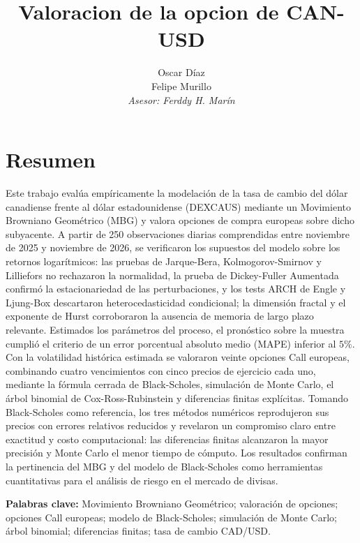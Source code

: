 \documentclass{article}
\title{Valoracion de la opcion de CAN-USD}
\author{
    Oscar Díaz\\
    Felipe Murillo\\
    \textit{Asesor: Ferddy H. Marín}
}
\date{}
\begin{document}
\maketitle

\section*{Resumen}
Este trabajo evalúa empíricamente la modelación de la tasa de cambio del dólar canadiense frente al dólar estadounidense (DEXCAUS) mediante un Movimiento Browniano Geométrico (MBG) y valora opciones de compra europeas sobre dicho subyacente. A partir de 250 observaciones diarias comprendidas entre noviembre de 2025 y noviembre de 2026, se verificaron los supuestos del modelo sobre los retornos logarítmicos: las pruebas de Jarque-Bera, Kolmogorov-Smirnov y Lilliefors no rechazaron la normalidad, la prueba de Dickey-Fuller Aumentada confirmó la estacionariedad de las perturbaciones, y los tests ARCH de Engle y Ljung-Box descartaron heterocedasticidad condicional; la dimensión fractal y el exponente de Hurst corroboraron la ausencia de memoria de largo plazo relevante. Estimados los parámetros del proceso, el pronóstico sobre la muestra cumplió el criterio de un error porcentual absoluto medio (MAPE) inferior al $5\%$. Con la volatilidad histórica estimada se valoraron veinte opciones Call europeas, combinando cuatro vencimientos con cinco precios de ejercicio cada uno, mediante la fórmula cerrada de Black-Scholes, simulación de Monte Carlo, el árbol binomial de Cox-Ross-Rubinstein y diferencias finitas explícitas. Tomando Black-Scholes como referencia, los tres métodos numéricos reprodujeron sus precios con errores relativos reducidos y revelaron un compromiso claro entre exactitud y costo computacional: las diferencias finitas alcanzaron la mayor precisión y Monte Carlo el menor tiempo de cómputo. Los resultados confirman la pertinencia del MBG y del modelo de Black-Scholes como herramientas cuantitativas para el análisis de riesgo en el mercado de divisas.

\vspace{0.5em}
\noindent\textbf{Palabras clave:} Movimiento Browniano Geométrico; valoración de opciones; opciones Call europeas; modelo de Black-Scholes; simulación de Monte Carlo; árbol binomial; diferencias finitas; tasa de cambio CAD/USD.
\end{document}
